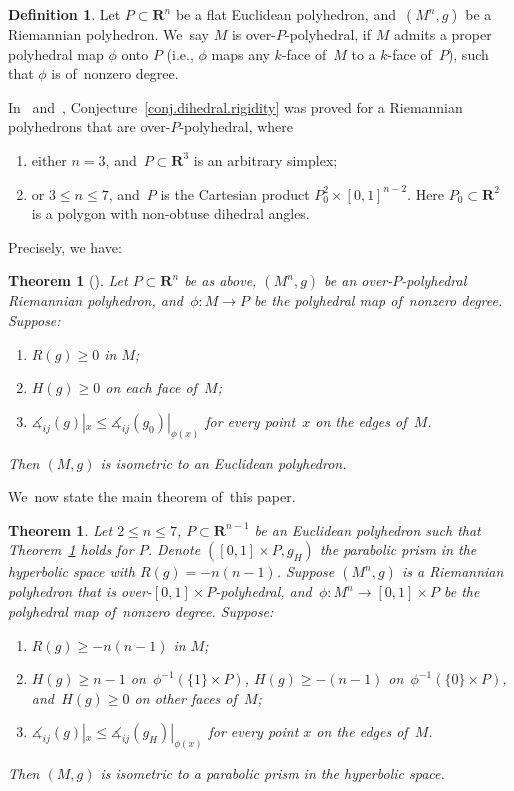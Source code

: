 \documentclass[10pt,a4paper]{amsart}
\numberwithin{equation}{section}
\newtheorem{theo}[prop]{Theorem}
\theoremstyle{definition}
\newtheorem{defi}[prop]{Definition}
\newcommand{\RR}{\mathbf{R}}
\begin{document}
\begin{defi}Let $P\subset \RR^n$ be a flat Euclidean polyhedron, and~$(M^n,g)$ be a Riemannian poly\-hedron. We~say $M$ is over-$P$-polyhedral, if $M$ admits a proper polyhedral map $\phi$ onto $P$ (i.e., $\phi$ maps any $k$-face of~$M$ to a $k$-face of~$P$), such that $\phi$ is of~nonzero degree.
\end{defi}

In~\cite{Li2017polyhedron} and~\cite{li2019dihedral}, Conjecture~\ref{conj.dihedral.rigidity} was proved for a Riemannian polyhedrons that are over-$P$-polyhedral, where
\begin{enumerate}\itemsep=0pt
\item[1)] either $n=3$, and~$P\subset\RR^3$ is an arbitrary simplex;
\item[2)] or $3\le n\le 7$, and~$P$ is the Cartesian product $P_0^2\times [0,1]^{n-2}$. Here $P_0\subset \RR^2$ is a polygon with non-obtuse dihedral angles.
\end{enumerate}
Precisely, we have:

\begin{theo}[\cite{Li2017polyhedron,li2019dihedral}]\label{theo.dihedral.rigidity}
Let $P\subset \RR^n$ be as above, $(M^n,g)$ be an over-$P$-polyhedral Riemannian polyhedron, and~$\phi\colon M\rightarrow P$ be the polyhedral map of~nonzero degree. Suppose:
\begin{enumerate}\itemsep=0pt
\item[${\rm 1)}$] $R(g)\ge 0$ in $M$;
\item[${\rm 2)}$] $H(g)\ge 0$ on each face of~$M$;
\item[${\rm 3)}$] $\measuredangle_{ij}(g)|_x\le \measuredangle_{ij}(g_0)|_{\phi(x)}$ for every point~$x$ on the edges of~$M$.
\end{enumerate}
Then $(M,g)$ is isometric to an Euclidean polyhedron.
\end{theo}

We~now state the main theorem of~this paper.


\begin{theo}\label{theo.main}Let $2\le n \le 7$, $P\subset \RR^{n-1}$ be an Euclidean polyhedron such that Theorem~{\rm \ref{theo.dihedral.rigidity}} holds for $P$. Denote $([0,1]\times P,g_H)$ the parabolic prism in the hyperbolic space with $R(g)=-n(n-1)$. Suppose $(M^n,g)$ is a Riemannian polyhedron that is over-$[0,1]\times P$-polyhedral, and~$\phi\colon M^n\rightarrow [0,1]\times P$ be the polyhedral map of~nonzero degree. Suppose:
\begin{enumerate}\itemsep=0pt
\item[${\rm 1)}$] $R(g)\ge -n(n-1)$ in $M$;
\item[${\rm 2)}$] $H(g)\ge n-1$ on~$\phi^{-1}(\{1\}\times P)$, $H(g)\ge -(n-1)$ on~$\phi^{-1}(\{0\}\times P)$, and~$H(g)\ge 0$ on other faces of~$M$;
\item[${\rm 3)}$] $\measuredangle_{ij}(g)|_x\le \measuredangle_{ij}(g_H)|_{\phi(x)}$ for every point $x$ on the edges of~$M$.
\end{enumerate}
Then $(M,g)$ is isometric to a parabolic prism in the hyperbolic space.
\end{theo}
\end{document}
